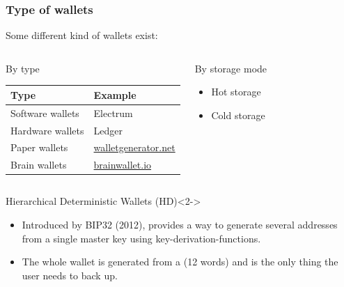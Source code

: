 \documentclass[notitlepage, usenames,dvipsnames]{beamer}
\newcommand{\st}{\structure}
\begin{document}
    \begin{frame}
        \frametitle{Type of wallets}
        
        \vspace{2ex}
        Some different kind of wallets exist:
        
        \vspace{-1ex}
        \begin{columns}[t]
            \begin{block}{By type}\centering
            \begin{tabular}{p{}l}
                \textbf{Type}  & \textbf{Example} \\ \hline
                Software wallets & Electrum \\
                Hardware wallets & Ledger \\
                Paper wallets  & \href{https://walletgenerator.net}{walletgenerator.net} \\
                Brain wallets  & \href{https://brainwallet.io/}{brainwallet.io} \\
            \end{tabular}
            \end{block}
            
            \begin{block}{By storage mode}
                \begin{itemize}
                \item Hot storage
                \item Cold storage
                \end{itemize}
            \end{block}
        \end{columns}

        \begin{block}{Hierarchical Deterministic Wallets (HD)}<2->
        
            \begin{itemize}
             \item Introduced by BIP32 (2012), provides a way to generate \alert{several} addresses from a \alert{single} master key using key-derivation-functions.
             \item The whole wallet is generated from a \st{seed} (12 words) and is the only thing the user needs to back up.
            \end{itemize}
            
        \end{block}
        
    \end{frame}
\end{document}
